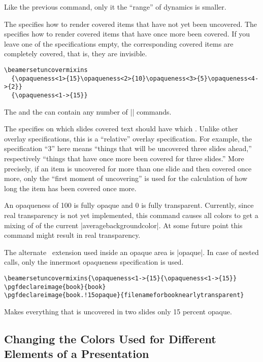 \begin{command}{\beamertemplatetransparentcovereddynamicmedium}
  Like the previous command, only it the ``range'' of dynamics is
  smaller. 
\end{command}

\begin{command}{\beamersetuncovermixins{}%
    }
  The  specifies  how to render covered items that
  have not  yet been uncovered. The  specifies
  how to render covered items that have once more been covered. 
  If you leave one of the specifications empty, the corresponding
  covered items are completely covered, that is, they are invisible.
  \example
\begin{verbatim}
\beamersetuncovermixins
  {\opaqueness<1>{15}\opaqueness<2>{10}\opaqueness<3>{5}\opaqueness<4->{2}}
  {\opaqueness<1->{15}}
\end{verbatim}
  The  and the   can
  contain any number of |\opaqueness| commands.
\end{command}

\begin{command}{\opaqueness{}}
  The  specifies on which slides covered
  text should have which . Unlike
  other overlay specifications, this  is a
  ``relative'' overlay specification. For example, the specification
  ``3'' here means ``things that will be uncovered three slides
  ahead,'' respectively ``things that have once more been covered for
  three slides.'' More precisely, if an item is uncovered for more
  than one slide and then covered once more, only the ``first moment
  of uncovering'' is used for the calculation of how long the item has
  been covered once more.

  An opaqueness of 100 is fully opaque and 0 is fully
  transparent. Currently, since real transparency is not yet
  implemented, this command causes all colors to get a mixing of
   of the current
  |averagebackgroundcolor|. At some future point this command might
  result in real transparency.

  The alternate \pgf\ extension used inside an opaque area is
  |opaque|. In case of nested calls,
  only the innermost opaqueness specification is used. 
  \example
\begin{verbatim}
\beamersetuncovermixins{\opaqueness<1->{15}{\opaqueness<1->{15}}
\pgfdeclareimage{book}{book}
\pgfdeclareimage{book.!15opaque}{filenameforbooknearlytransparent}
\end{verbatim}
  Makes everything that is uncovered in two slides only 15 percent
  opaque. 
\end{command}



\subsection{Changing the Colors Used for Different Elements of a Presentation}




